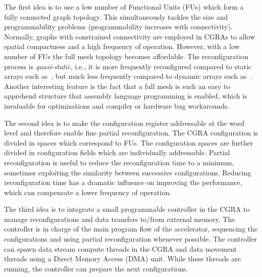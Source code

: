 \documentclass[journal]{IEEEtran}
\begin{document}

The first idea is to use a low number of Functional Units (FUs) which
form a fully connected graph topology. This simultaneously tackles the
size and programmability problems (programmability increases with
connectivity). Normally, graphs with constrained connectivity are
employed in CGRAs to allow spatial compactness and a high frequency of
operation. However, with a low number of FUs the full mesh topology
becomes affordable. The reconfiguration process is {\em quasi-static},
i.e., it is more frequently reconfigured compared to static arrays
such as~\cite{Hartenstein99}, but much less frequently compared to
dynamic arrays such as~\cite{Mei05}. Another interesting feature is
the fact that a full mesh is such an easy to apprehend structure that
assembly language programming is enabled, which is invaluable for
optimizations and compiler or hardware bug workarounds.

The second idea is to make the configuration register addressable at
the word level and therefore enable fine partial reconfiguration. The
CGRA configuration is divided in spaces which correspond to FUs. The
configuration spaces are further divided in configuration fields which
are individually addressable. Partial reconfiguration is useful to
reduce the reconfiguration time to a minimum, sometimes exploiting the
similarity between successive configurations. Reducing reconfiguration
time has a dramatic influence on improving the performance, which can
compensate a lower frequency of operation.

The third idea is to integrate a small programmable controller in the
CGRA to manage reconfigurations and data transfers to/from external
memory. The controller is in charge of the main program flow of the
accelerator, sequencing the configurations and using partial
reconfiguration whenever possible. The controller can spawn data
stream compute threads in the CGRA and data movement threads using a
Direct Memory Access (DMA) unit. While these threads are running, the
controller can prepare the next configurations.


\end{document}
